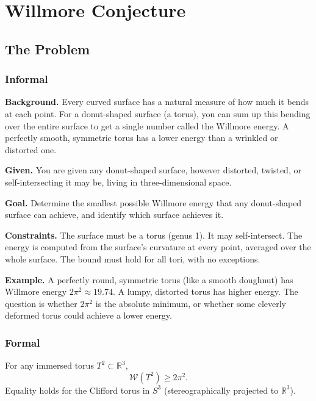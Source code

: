 \let\LocalMacro\relax

\chapter{Willmore Conjecture}

\section{The Problem}

\subsection{Informal}

\textbf{Background.} Every curved surface has a natural measure of how much it bends at each point. For a donut-shaped surface (a torus), you can sum up this bending over the entire surface to get a single number called the Willmore energy. A perfectly smooth, symmetric torus has a lower energy than a wrinkled or distorted one.

\textbf{Given.} You are given any donut-shaped surface, however distorted, twisted, or self-intersecting it may be, living in three-dimensional space.

\textbf{Goal.} Determine the smallest possible Willmore energy that any donut-shaped surface can achieve, and identify which surface achieves it.

\textbf{Constraints.} The surface must be a torus (genus 1). It may self-intersect. The energy is computed from the surface's curvature at every point, averaged over the whole surface. The bound must hold for all tori, with no exceptions.

\textbf{Example.} A perfectly round, symmetric torus (like a smooth doughnut) has Willmore energy $2\pi^2 \approx 19.74$. A lumpy, distorted torus has higher energy. The question is whether $2\pi^2$ is the absolute minimum, or whether some cleverly deformed torus could achieve a lower energy.

\subsection{Formal}
\begin{conjecture}[Willmore, 1965]
For any immersed torus $T^2 \subset \mathbb{R}^3$,
\[
\mathcal{W}(T^2) \ge 2\pi^2.
\]
Equality holds for the Clifford torus in $S^3$ (stereographically projected to $\mathbb{R}^3$).
\end{conjecture}

